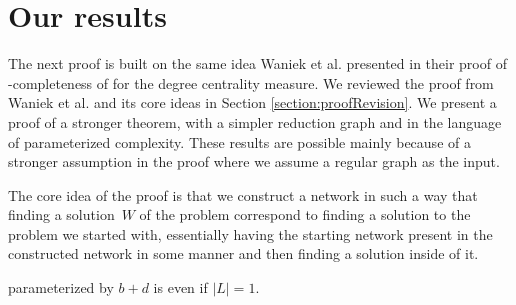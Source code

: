 \section{Our results}\label{section:OurResults}

The next proof is built on the same idea Waniek et al. \cite{Waniek2017} presented in their proof of
\NP-completeness of \HLshort for the degree centrality measure.
We reviewed the proof from Waniek et al. \cite{Waniek2017} and its core ideas in Section \ref{section:proofRevision}.
We present a proof of a stronger theorem, with a simpler reduction graph and in the language of parameterized complexity.
These results are possible mainly because of a stronger assumption in the proof where we assume a regular graph as the input.

The core idea of the proof is that we construct a network in such a way that finding a solution~$W$ of the \HL problem
correspond to finding a solution to the problem we started with, essentially having the starting network
present in the constructed network in some manner and then finding a solution inside of it.

\begin{theorem}\label{theorem:DB}
    \HL parameterized by $b + d$ is \Wh even if $|L| = 1$.
\end{theorem}

